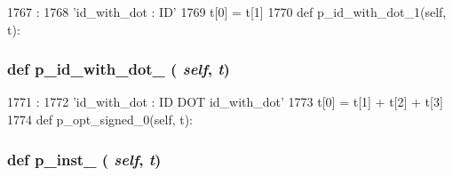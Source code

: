 \begin{DoxyCode}
1767                                 :
1768         'id_with_dot : ID'
1769         t[0] = t[1]
1770 
    def p_id_with_dot_1(self, t):
\end{DoxyCode}
\hypertarget{classisa__parser_1_1ISAParser_a1e74f312da11d484e5f38ac637e58e98}{
\subsubsection[{p\_\-id\_\-with\_\-dot\_\-1}]{\setlength{\rightskip}{0pt plus 5cm}def p\_\-id\_\-with\_\-dot\_ ( {\em self}, \/   {\em t})}}
\label{classisa__parser_1_1ISAParser_a1e74f312da11d484e5f38ac637e58e98}



\begin{DoxyCode}
1771                                 :
1772         'id_with_dot : ID DOT id_with_dot'
1773         t[0] = t[1] + t[2] + t[3]
1774 
    def p_opt_signed_0(self, t):
\end{DoxyCode}
\hypertarget{classisa__parser_1_1ISAParser_a0b0c46f13751ae97e4613c111feb0f11}{
\subsubsection[{p\_\-inst\_\-0}]{\setlength{\rightskip}{0pt plus 5cm}def p\_\-inst\_ ( {\em self}, \/   {\em t})}}
\label{classisa__parser_1_1ISAParser_a0b0c46f13751ae97e4613c111feb0f11}



